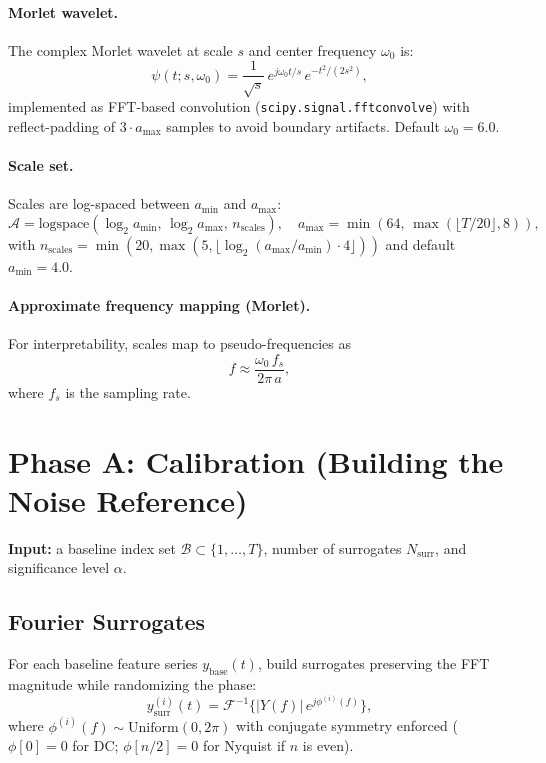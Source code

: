 \documentclass{article}
\begin{document}
\paragraph{Morlet wavelet.}
The complex Morlet wavelet at scale $s$ and center frequency $\omega_0$ is:
\[
\psi(t; s, \omega_0) = \frac{1}{\sqrt{s}}\,e^{j\omega_0 t/s}\,e^{-t^2/(2s^2)},
\]
implemented as FFT-based convolution (\texttt{scipy.signal.fftconvolve}) with reflect-padding of
$3\cdot a_{\max}$ samples to avoid boundary artifacts. Default $\omega_0 = 6.0$.

\paragraph{Scale set.}
Scales are log-spaced between $a_{\min}$ and $a_{\max}$:
\[
\mathcal{A} = \mathrm{logspace}(\log_2 a_{\min},\, \log_2 a_{\max},\, n_{\mathrm{scales}}),\quad
a_{\max} = \min\!\left(64,\, \max\!\left(\lfloor T/20 \rfloor, 8\right)\right),
\]
with $n_{\mathrm{scales}} = \min(20, \max(5, \lfloor \log_2(a_{\max}/a_{\min})\cdot 4\rfloor))$ and
default $a_{\min} = 4.0$.

\paragraph{Approximate frequency mapping (Morlet).}
For interpretability, scales map to pseudo-frequencies as
\[
f \approx \frac{\omega_0 \, f_s}{2\pi\, a},
\]
where $f_s$ is the sampling rate.

\section{Phase A: Calibration (Building the Noise Reference)}
\textbf{Input:}
a baseline index set $\mathcal{B}\subset\{1,\dots,T\}$, number of surrogates $N_{\text{surr}}$,
and significance level $\alpha$.

\subsection{Fourier Surrogates}
For each baseline feature series $y_{\text{base}}(t)$, build surrogates preserving the FFT magnitude
while randomizing the phase:
\[
y_{\text{surr}}^{(i)}(t) = \mathcal{F}^{-1}\!\Big\{|Y(f)|\,e^{j\phi^{(i)}(f)}\Big\},
\]
where $\phi^{(i)}(f)\sim \mathrm{Uniform}(0,2\pi)$ with conjugate symmetry enforced
($\phi[0] = 0$ for DC; $\phi[n/2] = 0$ for Nyquist if $n$ is even).
\end{document}
